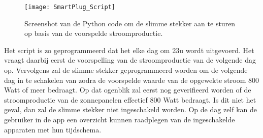 \begin{figure}[h!]
    \centering\texttt{[image: SmartPlug\_Script]}
    \caption{\label{fig:SmartPlug_Script}Screenshot van de Python code om de slimme stekker aan te sturen op basis van de voorspelde stroomproductie.}
\end{figure} 

Het script is zo geprogrammeerd dat het elke dag om 23u wordt uitgevoerd. Het vraagt daarbij eerst de voorspelling van de stroomproductie van de volgende dag op. Vervolgens zal de slimme stekker geprogrammeerd worden om de volgende dag in te schakelen van zodra de voorspelde waarde van de opgewekte stroom 800 Watt of meer bedraagt. Op dat ogenblik zal eerst nog geverifieerd worden of de stroomproductie van de zonnepanelen effectief 800 Watt bedraagt. Is dit niet het geval, dan zal de slimme stekker niet ingeschakeld worden. Op de dag zelf kan de gebruiker in de app een overzicht kunnen raadplegen van de ingeschakelde apparaten met hun tijdschema.